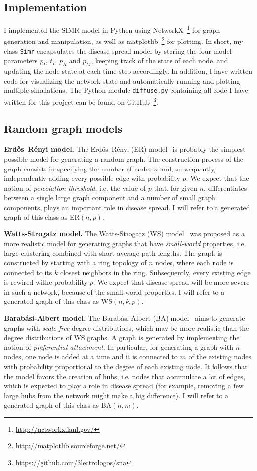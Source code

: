 \documentclass[11pt]{article} %
\begin{document}
\subsection{Implementation}
I implemented the SIMR model in Python using
NetworkX~\footnote{\url{http://networkx.lanl.gov/}} for graph
generation and manipulation, as well as
matplotlib~\footnote{\url{http://matplotlib.sourceforge.net/}} for plotting.
In short, my class \texttt{Simr} encapsulates the
disease spread model by storing the four model parameters $p_I$, $t_I$, $p_R$
and $p_M$, keeping track of the state of each node, and updating the node state
at each time step accordingly. In addition, I have
written code for visualizing the network state and automatically running
and plotting multiple simulations. The Python module \texttt{diffuse.py}
containing all code I have written for this project can be found on
GitHub~\footnote{\url{https://github.com/3lectrologos/sna}}.

\subsection{Random graph models}
\noindent\textbf{Erdős–Rényi model.} The Erdős–Rényi (ER) model~\cite{erdos} is
probably the simplest possible model for generating a random graph. The
construction process of the graph consists in specifying the number of
nodes $n$ and, subsequently, independently adding every possible edge
with probability $p$. We expect that the notion of \emph{percolation
threshold}, i.e. the value of $p$ that, for given $n$, differentiates
between a single large graph component and a number of small graph
components, plays an important role in disease spread. I will refer to a
generated graph of this class as ER$(n, p)$.

\noindent\textbf{Watts-Strogatz model.} The Watts-Strogatz (WS)
model~\cite{watts} was proposed as a more realistic model for generating graphs
that have \emph{small-world} properties, i.e. large clustering combined with
short average path lengths. The graph is constructed by starting with a ring
topology of $n$ nodes, where each node is connected to its $k$ closest neighbors
in the ring. Subsequently, every existing edge is rewired withe probability $p$.
We expect that disease spread will be more severe in such a network, because
of the small-world properties. I will refer to a generated graph of this class
as WS$(n, k, p)$.

\noindent\textbf{Barabási-Albert model.} The Barabási-Albert (BA)
model~\cite{barabasi} aims to generate graphs with \emph{scale-free} degree
distributions, which may be more realistic than the degree distributions of
WS graphs. A graph is generated by implementing the notion of
\emph{preferential attachment}. In particular, for generating a graph with
$n$ nodes, one node is added at a time and it is connected to $m$ of the
existing nodes with probability proportional to the degree of each existing
node. It follows that the model favors the creation of hubs, i.e. nodes that
accumulate a lot of edges, which is expected to play a role in disease spread
(for example, removing a few large hubs from the network might make a big
difference). I will refer to a generated graph of this class
as BA$(n, m)$.
\end{document}
